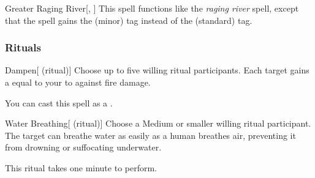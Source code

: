 \lowercase{\hypertarget{spell:Greater Raging River}{}}\label{spell:Greater Raging River}
\begin{freeability}[\nth{5}]{\hypertarget{spell:Greater Raging River}{Greater Raging River}}[, ]
This spell functions like the \textit{raging river} spell, except that the spell gains the  (minor) tag instead of the  (standard) tag.
\end{freeability}
\vspace{0.25em}



\subsubsection{Rituals}


\lowercase{\hypertarget{spell:Dampen}{}}\label{spell:Dampen}
\begin{attuneability}[\nth{1}]{\hypertarget{spell:Dampen}{Dampen}}[ (ritual)]
Choose up to five willing ritual participants.
Each target gains a  equal to your  to  against fire damage.

You can cast this spell as a .
\end{attuneability}
\vspace{0.25em}



\lowercase{\hypertarget{spell:Water Breathing}{}}\label{spell:Water Breathing}
\begin{attuneability}[\nth{2}]{\hypertarget{spell:Water Breathing}{Water Breathing}}[ (ritual)]
Choose a Medium or smaller willing ritual participant.
The target can breathe water as easily as a human breathes air, preventing it from drowning or suffocating underwater.

This ritual takes one minute to perform.
\end{attuneability}
\vspace{0.25em}


